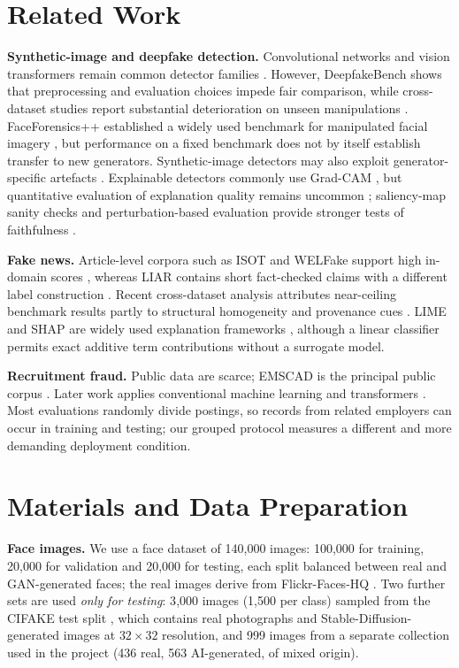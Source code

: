 \documentclass[11pt,a4paper]{article}
\begin{document}
\section{Related Work}
\textbf{Synthetic-image and deepfake detection.} Convolutional networks and vision transformers
remain common detector families \cite{soudy2024deepfake,mirsky2021deepfakes}. However,
DeepfakeBench shows that preprocessing and evaluation choices impede fair comparison, while
cross-dataset studies report substantial deterioration on unseen manipulations
\cite{yan2023deepfakebench,nadimpalli2022crossdataset}. FaceForensics++ established a widely used
benchmark for manipulated facial imagery \cite{rossler2019faceforensics}, but performance on a
fixed benchmark does not by itself establish transfer to new generators. Synthetic-image detectors may also exploit
generator-specific artefacts \cite{wang2020cnngenerated}. Explainable detectors commonly use
Grad-CAM \cite{selvaraju2017gradcam,mansoor2025xai}, but quantitative evaluation of explanation
quality remains uncommon \cite{tsigos2024quantitative}; saliency-map sanity checks and
perturbation-based evaluation provide stronger tests of faithfulness
\cite{adebayo2018sanity,petsiuk2018rise}.

\textbf{Fake news.} Article-level corpora such as ISOT and WELFake support high in-domain scores
\cite{ahmed2017isot,verma2021welfake}, whereas LIAR contains short fact-checked claims with a
different label construction \cite{wang2017liar}. Recent cross-dataset analysis attributes
near-ceiling benchmark results partly to structural homogeneity and provenance cues
\cite{calvo2026generalization}. LIME and SHAP are widely used explanation frameworks
\cite{ribeiro2016lime,lundberg2017shap}, although a linear classifier permits exact additive term
contributions without a surrogate model.

\textbf{Recruitment fraud.} Public data are scarce; EMSCAD is the principal public corpus
\cite{vidros2017emscad}. Later work applies conventional machine learning and transformers
\cite{naude2023recruitment,taneja2025fraudbert}. Most evaluations randomly divide postings, so
records from related employers can occur in training and testing; our grouped protocol measures a
different and more demanding deployment condition.

\section{Materials and Data Preparation}
\label{sec:data}
\textbf{Face images.} We use a face dataset of 140{,}000 images: 100{,}000 for training, 20{,}000 for validation and 20{,}000 for testing, each split balanced between real and GAN-generated faces; the real images derive from Flickr-Faces-HQ \cite{karras2019stylegan}. Two further sets are used \emph{only for testing}: 3{,}000 images (1{,}500 per class) sampled from the CIFAKE test split \cite{bird2024cifake}, which contains real photographs and Stable-Diffusion-generated images at $32\times32$ resolution, and 999 images from a separate collection used in the project (436 real, 563 AI-generated, of mixed origin).
\end{document}
